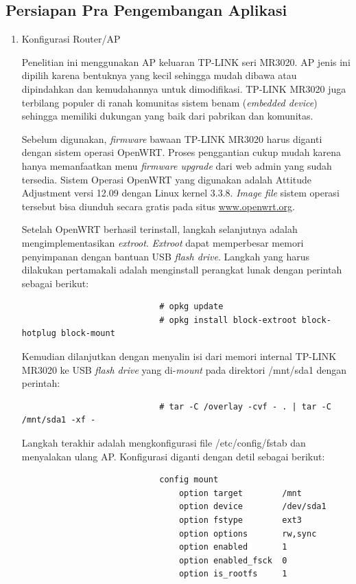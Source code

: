 		\subsection{Persiapan Pra Pengembangan Aplikasi}
			\begin{enumerate}
				\item Konfigurasi Router/AP

					Penelitian ini menggunakan AP keluaran TP-LINK seri MR3020. AP jenis ini dipilih karena bentuknya yang kecil sehingga mudah dibawa atau dipindahkan dan kemudahannya untuk dimodifikasi. TP-LINK MR3020 juga terbilang populer di ranah komunitas sistem benam (\emph{embedded device}) sehingga memiliki dukungan yang baik dari pabrikan dan komunitas. 

					Sebelum digunakan, \emph{firmware} bawaan TP-LINK MR3020 harus diganti dengan sistem operasi OpenWRT. Proses penggantian cukup mudah karena hanya memanfaatkan menu \emph{firmware upgrade} dari web admin yang sudah tersedia.	Sistem Operasi OpenWRT yang digunakan adalah Attitude Adjustment versi 12.09 dengan Linux kernel 3.3.8. \emph{Image file} sistem operasi tersebut bisa diunduh secara gratis pada situs \url{www.openwrt.org}.

					Setelah OpenWRT berhasil terinstall, langkah selanjutnya adalah mengimplementasikan \emph{extroot}. \emph{Extroot} dapat memperbesar memori penyimpanan dengan bantuan USB \emph{flash drive}. Langkah yang harus dilakukan pertamakali adalah menginstall perangkat lunak dengan perintah sebagai berikut:
					\begingroup
					    \fontsize{10pt}{12pt}\selectfont
					    \begin{verbatim}
							# opkg update
							# opkg install block-extroot block-hotplug block-mount
					    \end{verbatim}  
					\endgroup

					Kemudian dilanjutkan dengan menyalin isi dari memori internal TP-LINK MR3020 ke USB \emph{flash drive} yang di-\emph{mount} pada direktori /mnt/sda1 dengan perintah:
					\begingroup
					    \fontsize{10pt}{12pt}\selectfont
					    \begin{verbatim}
							# tar -C /overlay -cvf - . | tar -C /mnt/sda1 -xf -
					    \end{verbatim}  
					\endgroup

					Langkah terakhir adalah mengkonfigurasi file /etc/config/fstab dan menyalakan ulang AP. Konfigurasi diganti dengan detil sebagai berikut:
					\begingroup
					    \fontsize{10pt}{12pt}\selectfont
					    \begin{verbatim}
							config mount
						        option target        /mnt
						        option device        /dev/sda1
						        option fstype        ext3
						        option options       rw,sync
						        option enabled       1
						        option enabled_fsck  0
						        option is_rootfs     1
					    \end{verbatim}  
					\endgroup


\end{enumerate}
